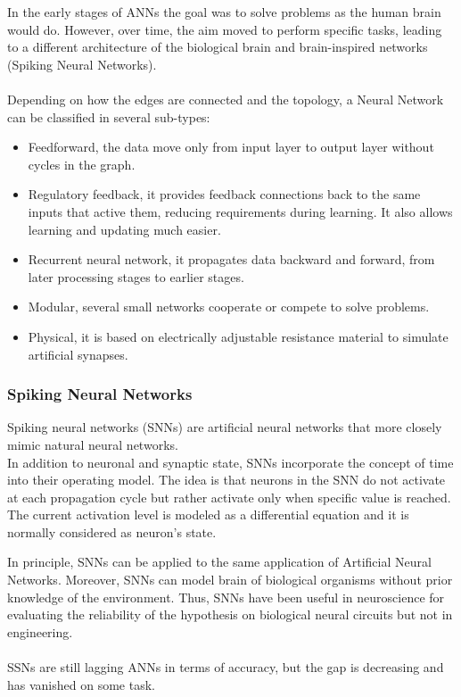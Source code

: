 In the early stages of ANNs the goal was to solve problems as the human brain would do. However, over time, the aim moved to perform specific tasks, leading to a different architecture of the biological brain and brain-inspired networks (Spiking Neural Networks).\\\\
Depending on how the edges are connected and the topology, a Neural Network can be classified in several sub-types:
\begin{itemize}
\item Feedforward, the data move only from input layer to output layer without cycles in the graph.
\item Regulatory feedback, it provides feedback connections back to the same inputs that active them, reducing requirements during learning. It also allows learning and updating much easier.
\item Recurrent neural network, it propagates data backward and forward, from later processing stages to earlier stages.
\item Modular, several small networks cooperate or compete to solve problems.
\item Physical, it is based on electrically adjustable resistance material to simulate artificial synapses.
\end{itemize}

\subsubsection{Spiking Neural Networks}
Spiking neural networks (SNNs) are artificial neural networks that more closely mimic natural neural networks\cite{article:1}. \\In addition to neuronal and synaptic state, SNNs incorporate the concept of time into their operating model. The idea is that neurons in the SNN do not activate at each propagation cycle but rather activate only when specific value is reached.\\
The current activation level is modeled as a differential equation and it is normally considered as neuron's state.

In principle, SNNs can be applied to the same application of Artificial Neural Networks. Moreover, SNNs can model brain of biological organisms without prior knowledge of the environment. Thus, SNNs have been useful in neuroscience for evaluating the reliability of the hypothesis on biological neural circuits but not in engineering.\\\\
SSNs are still lagging ANNs in terms of accuracy, but the gap is decreasing and has vanished on some task\cite{article:2}.
